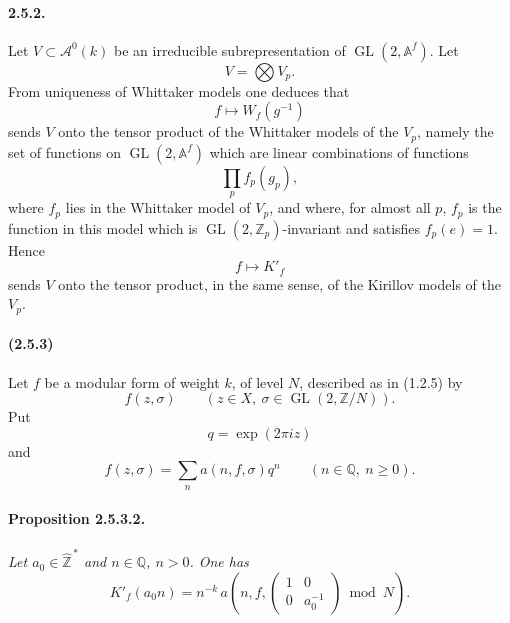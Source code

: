 \documentclass[10pt,a4paper]{article}
\providecommand{\GL}{\operatorname{GL}}
\providecommand{\Q}{\mathbb Q}
\providecommand{\Z}{\mathbb Z}
\providecommand{\Af}{\mathbb A^f}
\begin{document}
\paragraph{2.5.2.} Let \(V\subset \mathcal A^0(k)\) be an irreducible subrepresentation of \(\GL(2,\Af)\). Let
\[
V=\bigotimes V_p.
\]
From uniqueness of Whittaker models one deduces that
\[
f\longmapsto W_f(g^{-1})
\]
sends \(V\) onto the tensor product of the Whittaker models of the \(V_p\), namely the set of functions on \(\GL(2,\Af)\) which are linear combinations of functions
\[
\prod_p f_p(g_p),
\]
where \(f_p\) lies in the Whittaker model of \(V_p\), and where, for almost all \(p\), \(f_p\) is the function in this model which is \(\GL(2,\Z_p)\)-invariant and satisfies \(f_p(e)=1\). Hence
\[
f\longmapsto K'_f
\]
sends \(V\) onto the tensor product, in the same sense, of the Kirillov models of the \(V_p\).

\paragraph{(2.5.3)} Let \(f\) be a modular form of weight \(k\), of level \(N\), described as in (1.2.5) by
\[
f(z,\sigma)\qquad
(z\in X,\ \sigma\in\GL(2,\Z/N)).
\]
Put
\[
q=\exp(2\pi iz)
\]
and
\[
\tag{2.5.3.1}
f(z,\sigma)=\sum_n a(n,f,\sigma)q^n
\qquad(n\in\Q,\ n\ge0).
\]

\clearpage
{}
\hypertarget{authority-35}{}
\paragraph{Proposition 2.5.3.2.}{\itshape  Let \(a_0\in\widehat{\Z}^{\,*}\) and \(n\in\Q\), \(n>0\). One has
\[
K'_f(a_0n)
=
n^{-k}\,
a\!\left(n,f,\begin{pmatrix}1&0\\0&a_0^{-1}\end{pmatrix}\bmod N\right).
\]\par}
\end{document}
